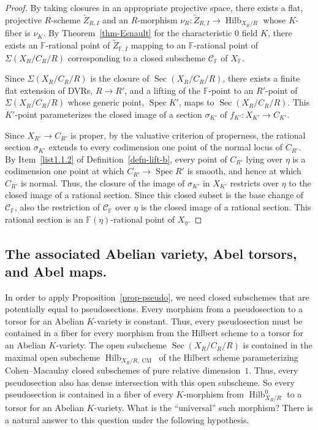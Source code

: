 \documentclass[11pt]{article}
\theoremstyle{definition}
\numberwithin{equation}{section}
\numberwithin{figure}{section}
\numberwithin{table}{section}
\newcommand{\mbb}{\mathbb}
\newcommand{\FF}{\mbb{F}}
\newcommand{\mc}{\mathcal}
\newcommand{\wt}{\widetilde}
\newcommand{\Xx}{X}
\newcommand{\Cc}{C}
\newcommand{\Rr}{R}
\newcommand{\FR}{K}
\DeclareMathOperator{\SP}{Spec}
\DeclareMathOperator{\Hilb}{Hilb}
\DeclareMathOperator{\Sec}{Sec}
\DeclareMathOperator{\cm}{CM}
\begin{document}
\begin{proof}
By taking closures in an appropriate projective space, there exists a flat, projective $\Rr$-scheme $\wt{Z}_{\Rr,I}$ and an $\Rr$-morphism $\nu_{\Rr}:\wt{Z}_{\Rr,I} \to \Hilb_{\Xx_\Rr/\Rr}$ whose $\FR$-fiber is $\nu_\FR$. By Theorem~\ref{thm-Esnault} for the characteristic $0$ field $\FR$, there exists an $\FF$-rational point of $\wt{Z}_{\FF,I}$ mapping to an $\FF$-rational point of $\Sigma(\Xx_{\Rr}/\Cc_{\Rr}/\Rr)$ corresponding to a closed subscheme $\mc{C}_\FF$ of $\Xx_\FF$.

Since $\Sigma(\Xx_{\Rr}/\Cc_{\Rr}/\Rr)$ is the closure of $\Sec(\Xx_{\Rr}/\Cc_{\Rr}/\Rr)$, there exists a finite flat extension of DVRs, $\Rr\to \Rr'$, and a lifting of the $\FF$-point to an $\Rr'$-point of $\Sigma(\Xx_{\Rr}/\Cc_{\Rr}/\Rr)$ whose generic point, $\SP \FR'$, maps to $\Sec(\Xx_{\Rr}/\Cc_{\Rr}/\Rr)$. This $\FR'$-point parameterizes the closed image of a section $\sigma_{\FR'}$ of $f_{\FR'}:\Xx_{\FR'}\to \Cc_{\FR'}$.

Since $\Xx_{\Rr'}\to \Cc_{\Rr'}$ is proper, by the valuative criterion of properness, the rational section $\sigma_{\FR'}$ extends to every codimension one point of the normal locus of $\Cc_{\Rr'}$. By Item~\eqref{list1.1.2} of Definition~\ref{defn-lift-b}, every point of $\Cc_{\Rr'}$ lying over $\eta$ is a codimension one point at which $\Cc_{\Rr'}\to \SP \Rr'$ is smooth, and hence at which $\Cc_{\Rr'}$ is normal. Thus, the closure of the image of $\sigma_{\FR'}$ in $\Xx_{\FR'}$ restricts over $\eta$ to the closed image of a rational section. Since this closed subset is the base change of $\mc{C}_\FF$, also the restriction of $\mc{C}_\FF$ over $\eta$ is the closed image of a rational section. This rational section is an $\FF(\eta)$-rational point of $\Xx_\eta$.
\end{proof}

\subsection{The associated Abelian variety, Abel torsors, and Abel maps.} \label{subsec-Abelmap}
In order to apply Proposition~\ref{prop-pseudo}, we need closed subschemes that are potentially equal to pseudosections. Every morphism from a pseudosection to a torsor for an Abelian $\FR$-variety is constant. Thus, every pseudosection must be contained in a fiber for every morphism from the Hilbert scheme to a torsor for an Abelian $\FR$-variety. The open subscheme $\Sec(\Xx_\Rr/\Cc_\Rr/\Rr)$ is contained in the maximal open subscheme $\Hilb_{\Xx_\Rr/\Rr,\cm}$ of the Hilbert scheme parameterizing Cohen--Macaulay closed subschemes of pure relative dimension~$1$. Thus, every pseudosection also has dense intersection with this open subscheme. So every pseudosection is contained in a fiber of every $\FR$-morphism from $\Hilb^0_{\Xx_\Rr/\Rr}$ to a torsor for an Abelian $\FR$-variety. What is the ``universal'' such morphism? There is a natural answer to this question under the following hypothesis.
\end{document}
